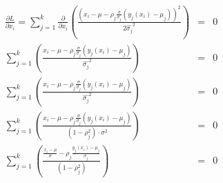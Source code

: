 \documentclass{article}
\begin{document}



\begin{eqnarray}
\frac{\partial L}{\partial x_i} = \sum_{j=1}^k \frac{\partial}{\partial x_i} \left( \frac{(x_i-\mu - \rho_j \frac{\sigma}{\sigma_j} (y_j(x_i) - \mu_j))^2}{2\widehat{\sigma_j}^2} \right) & = & 0 \nonumber \\
\sum_{j=1}^k  \left( \frac{x_i-\mu - \rho_j \frac{\sigma}{\sigma_j} (y_j(x_i) - \mu_j) }{\widehat{\sigma_j}^2} \right) & = & 0 \nonumber \\
\sum_{j=1}^k \left( \frac{x_i-\mu - \rho_j \frac{\sigma}{\sigma_j} (y_j(x_i) - \mu_j)}{\widehat{\sigma_j}^2} \right) & = & 0 \nonumber \\
\sum_{j=1}^k \left( \frac{x_i-\mu - \rho_j \frac{\sigma}{\sigma_j} (y_j(x_i) - \mu_j)}{(1-\rho_j^2) \cdot \sigma^2} \right) & = & 0 \nonumber \\
\sum_{j=1}^k \left( \frac{ \frac{x_i-\mu}{\sigma} - \rho_j \frac{y_j(x_i) - \mu_j}{\sigma_j}}{(1-\rho_j^2)} \right) & = & 0 \label{equ:diff} \\
\end{eqnarray}
\end{document}
